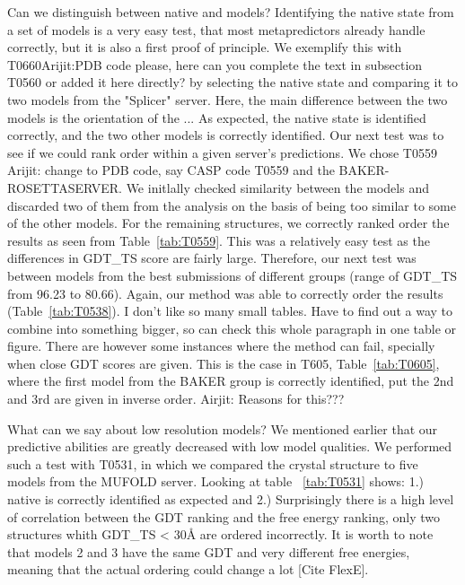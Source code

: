 \documentclass[12pt]{article}
\newcommand{\Alberto}[1]{\color{ForestGreen}#1\normalcolor }
\begin{document}
Can we distinguish between native and models? Identifying the native state from a set of models is a very easy test, that most metapredictors
already handle correctly, but it is also a first proof of principle. We exemplify this with
T0660\Alberto{Arijit:PDB code please, here can you complete the text in subsection T0560 or added it here
    directly?} by selecting the native state and comparing it to two models from the "Splicer"
server. Here, the main difference between the two models is the orientation of the ... As expected,
the native state is identified correctly, and the two other models is correctly identified. Our next test was to see if we could rank order within a given server's predictions. We chose
T0559 \Alberto{Arijit: change to PDB code, say CASP code T0559} and the BAKER-ROSETTASERVER. We
initlally checked similarity between the models and discarded two of them from the analysis on the
basis of being too similar to some of the other models. For the remaining structures, we correctly
ranked order the results as seen from Table~\protect\ref{tab:T0559}. This was a relatively easy test
as the differences in GDT\_TS score are fairly large. Therefore, our next test was between models
from the best submissions of different groups (range of GDT\_TS
from 96.23 to 80.66). Again, our method was able to correctly order the results
(Table~\protect\ref{tab:T0538}). \Alberto{I don't like so many small tables. Have to find out a way
    to combine into something bigger, so can check this whole paragraph in one table or figure.}
There are however some instances where the method can fail, specially when close GDT scores are
given. This is the case in T605, Table~\protect\ref{tab:T0605}, where the first model from the BAKER
group is correctly identified, put the 2nd and 3rd are given in inverse order. \Alberto{Airjit:
    Reasons for this???}

What can we say about low resolution models?
We mentioned earlier that our predictive abilities are greatly decreased with low model qualities.
We performed such a test with T0531, in which we compared the crystal structure to five models from
the MUFOLD server. Looking at table ~\protect\ref{tab:T0531} shows: 1.) native is correctly
identified as expected and 2.) Surprisingly there is a high level of correlation between the GDT
ranking and the free energy ranking, only two structures whith GDT\_TS < 30Å are ordered
incorrectly. It is worth to note that models 2 and 3 have the same GDT and very different free
energies, meaning that the actual ordering could change a lot [Cite FlexE].
\end{document}
